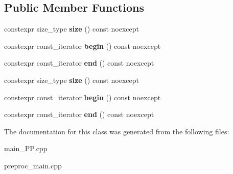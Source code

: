 \subsection*{Public Member Functions}
\begin{DoxyCompactItemize}
\item 
\hypertarget{classstd_1_1initializer__list_a04abb5eff7f9a8a102083f2048aec4da}{constexpr size\+\_\+type {\bfseries size} () const noexcept}\label{classstd_1_1initializer__list_a04abb5eff7f9a8a102083f2048aec4da}

\item 
\hypertarget{classstd_1_1initializer__list_ae821db6138f19ce5bb64ca7971e7ad02}{constexpr const\+\_\+iterator {\bfseries begin} () const noexcept}\label{classstd_1_1initializer__list_ae821db6138f19ce5bb64ca7971e7ad02}

\item 
\hypertarget{classstd_1_1initializer__list_a6a1a5da50dba02e82d20b9c9d176b4f4}{constexpr const\+\_\+iterator {\bfseries end} () const noexcept}\label{classstd_1_1initializer__list_a6a1a5da50dba02e82d20b9c9d176b4f4}

\item 
\hypertarget{classstd_1_1initializer__list_a04abb5eff7f9a8a102083f2048aec4da}{constexpr size\+\_\+type {\bfseries size} () const noexcept}\label{classstd_1_1initializer__list_a04abb5eff7f9a8a102083f2048aec4da}

\item 
\hypertarget{classstd_1_1initializer__list_ae821db6138f19ce5bb64ca7971e7ad02}{constexpr const\+\_\+iterator {\bfseries begin} () const noexcept}\label{classstd_1_1initializer__list_ae821db6138f19ce5bb64ca7971e7ad02}

\item 
\hypertarget{classstd_1_1initializer__list_a6a1a5da50dba02e82d20b9c9d176b4f4}{constexpr const\+\_\+iterator {\bfseries end} () const noexcept}\label{classstd_1_1initializer__list_a6a1a5da50dba02e82d20b9c9d176b4f4}

\end{DoxyCompactItemize}


The documentation for this class was generated from the following files\+:\begin{DoxyCompactItemize}
\item 
main\+\_\+\+P\+P.\+cpp\item 
preproc\+\_\+main.\+cpp\end{DoxyCompactItemize}
